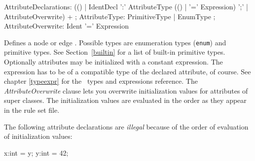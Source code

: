 \begin{rail}    
  AttributeDeclarations: (() | IdentDecl ':' AttributeType (() | '=' Expression) ';' | AttributeOverwrite) + ;
  AttributeType: PrimitiveType | EnumType ; 
  AttributeOverwrite: Ident '=' Expression
\end{rail}
Defines a node or edge . Possible types are enumeration types (\texttt{enum}) and primitive types. See Section~\ref{builtin} for a list of built-in primitive types. Optionally attributes may be initialized with a constant expression. The expression has to be of a compatible type of the declared attribute, of course. See chapter \ref{typeexpr} for the \GrG\ types and expressions reference. The \emph{AttributeOverwrite} clause lets you overwrite initialization values for attributes of super classes. The initialization values are evaluated in the order as they appear in the rule set file.
\begin{example}
	The following attribute declarations are \emph{illegal} because of the order of evaluation of initialization values:
	\begin{grgen}
x:int = y;
y:int = 42;	
	\end{grgen}
\end{example}

